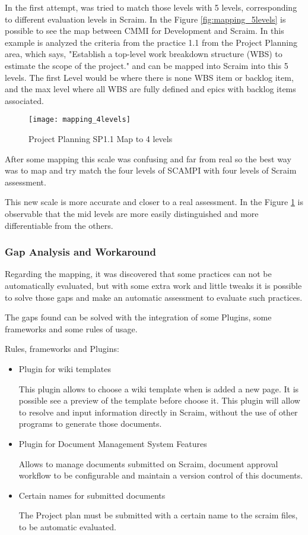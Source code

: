 In the first attempt, was tried to match those levels with 5 levels, corresponding to different evaluation levels in Scraim. In the Figure \ref{fig:mapping_5levels} is possible to see the map between CMMI for Development and Scraim. In this example is analyzed the criteria from the practice 1.1 from the Project Planning area, which says, "Establish a top-level work breakdown structure (WBS) to estimate the scope of the project." and can be mapped into Scraim into this 5 levels. The first Level would be where there is none WBS item or backlog item, and the max level where all WBS are fully defined and epics with backlog items associated. 

\begin{figure}[h]
	\begin{center}
		\leavevmode
		\texttt{[image: mapping\_4levels]}
		\caption{Project Planning SP1.1 Map to 4 levels}
		\label{fig:mapping_4levels}
	\end{center}
\end{figure}

After some mapping this scale was confusing and far from real so the best way was to map and try match the four levels of SCAMPI with four levels of Scraim assessment.

This new scale is more accurate and closer to a real assessment. In the Figure \ref{fig:mapping_4levels} is observable that the mid levels are more easily distinguished and more differentiable from the others. 

\subsubsection{Gap Analysis and Workaround}
Regarding the mapping, it was discovered  that some practices can not be automatically evaluated, but with some extra work and little tweaks it is possible to solve those gaps and make an automatic assessment to evaluate such practices.

The gaps found can be solved with the integration of some Plugins, some frameworks and some rules of usage.

Rules, frameworks and Plugins:
\begin{itemize}
	\item Plugin for wiki templates
	
	This plugin allows to choose a wiki template when is added a new page. It is possible see a preview of the template before choose it.
	This plugin will allow to resolve and input information directly in Scraim, without the use of other programs to generate those documents.
	
	\item Plugin for Document Management System Features
	
	Allows to manage documents submitted on Scraim, document approval workflow to be configurable and maintain a version control of this documents.
	
	\item Certain names for submitted documents
	
	The Project plan must be submitted with a certain name to the scraim files, to be automatic evaluated.
	
\end{itemize}